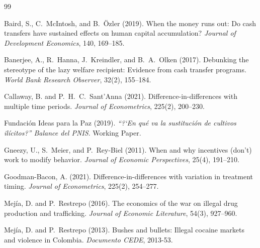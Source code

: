 \documentclass[12pt]{article}
\begin{document}



\iffalse
\begin{thebibliography}{99}

Baird, S., C.~McIntosh, and B.~\"{O}zler (2019).
\newblock When the money runs out: Do cash transfers have sustained effects on human capital accumulation?
\newblock \textit{Journal of Development Economics}, 140, 169--185.

Banerjee, A., R.~Hanna, J.~Kreindler, and B.~A.~Olken (2017).
\newblock Debunking the stereotype of the lazy welfare recipient: Evidence from cash transfer programs.
\newblock \textit{World Bank Research Observer}, 32(2), 155--184.

Callaway, B. and P.~H.~C.~Sant'Anna (2021).
\newblock Difference-in-differences with multiple time periods.
\newblock \textit{Journal of Econometrics}, 225(2), 200--230.

Fundaci\'{o}n Ideas para la Paz (2019).
\newblock \textit{\textquotedblleft{}?`En qu\'{e} va la sustituci\'{o}n de cultivos il\'{i}citos?\textquotedblright{} Balance del PNIS}.
\newblock Working Paper.

Gneezy, U., S.~Meier, and P.~Rey-Biel (2011).
\newblock When and why incentives (don't) work to modify behavior.
\newblock \textit{Journal of Economic Perspectives}, 25(4), 191--210.

Goodman-Bacon, A. (2021).
\newblock Difference-in-differences with variation in treatment timing.
\newblock \textit{Journal of Econometrics}, 225(2), 254--277.

Mej\'{i}a, D. and P.~Restrepo (2016).
\newblock The economics of the war on illegal drug production and trafficking.
\newblock \textit{Journal of Economic Literature}, 54(3), 927--960.

Mej\'{i}a, D. and P.~Restrepo (2013).
\newblock Bushes and bullets: Illegal cocaine markets and violence in Colombia.
\newblock \textit{Documento CEDE}, 2013-53.


\end{thebibliography}
\end{document}
